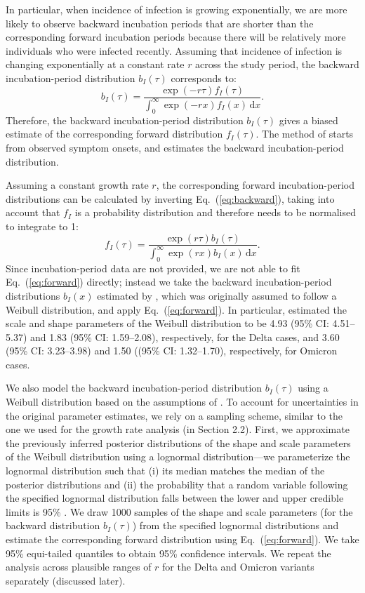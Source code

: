 \documentclass[12pt]{article}
\newcommand{\eref}[1]{Eq.~(\ref{eq:#1})}
\newcommand{\dd}[1]{\ensuremath{\, \mathrm{d}#1}}
\newcommand{\dx}{\dd{x}}
\begin{document}
In particular, when incidence of infection is growing exponentially, we are more likely to observe backward incubation periods that are shorter than the corresponding forward incubation periods because there will be relatively more individuals who were infected recently.
Assuming that incidence of infection is changing exponentially at a constant rate $r$ across the study period, the backward incubation-period distribution $b_I(\tau)$ corresponds to:
\begin{equation}
b_I(\tau) =\frac{ \exp(-r\tau) f_I(\tau)}{\int_0^\infty \exp(-r x) f_I(x)  \dx}.
\label{eq:backward}
\end{equation}
Therefore, the backward incubation-period distribution $b_I(\tau)$ gives a biased estimate of the corresponding forward distribution $f_I(\tau)$.
The method of \cite{backer2020incubation} starts from observed symptom onsets, and estimates the backward incubation-period distribution.

Assuming a constant growth rate $r$, the corresponding forward incubation-period distributions can be calculated by inverting \eref{backward}, taking into account that $f_I$ is a probability distribution and therefore needs to be normalised to integrate to 1:
\begin{equation}
f_I(\tau) = \frac{\exp(r\tau) b_I(\tau) }{\int_0^\infty \exp(rx) b_I(x)\dx}.
\label{eq:forward}
\end{equation}
Since incubation-period data are not provided, we are not able to fit \eref{forward} directly; 
instead we take the backward incubation-period distributions $b_I(x)$ estimated by \cite{backer2021omicron}, which was originally assumed to follow a Weibull distribution, and apply \eref{forward}.
In particular, \cite{backer2021omicron} estimated the scale and shape parameters of the Weibull distribution to be 4.93 (95\% CI: 4.51--5.37) and 1.83 (95\% CI: 1.59--2.08), respectively, for the Delta cases, and 3.60 (95\% CI: 3.23--3.98) and 1.50 ((95\% CI: 1.32--1.70), respectively, for Omicron cases.

We also model the backward incubation-period distribution $b_I(\tau)$ using a Weibull distribution based on the assumptions of \cite{backer2021omicron}.
To account for uncertainties in the original parameter estimates, we rely on a sampling scheme, similar to the one we used for the growth rate analysis (in Section 2.2).
First, we approximate the previously inferred posterior distributions of the shape and scale parameters of the Weibull distribution using a lognormal distribution---we parameterize the lognormal distribution such that (i) its median matches the median of the posterior distributions and (ii) the probability that a random variable following the specified lognormal distribution falls between the lower and upper credible limits is 95\% \citep{park2020reconciling}.
We draw 1000 samples of the shape and scale parameters (for the backward distribution $b_I(\tau)$) from the specified lognormal distributions and estimate the corresponding forward distribution using \eref{forward}.
We take 95\% equi-tailed quantiles to obtain 95\% confidence intervals.
We repeat the analysis across plausible ranges of $r$ for the Delta and Omicron variants separately (discussed later).
\end{document}
